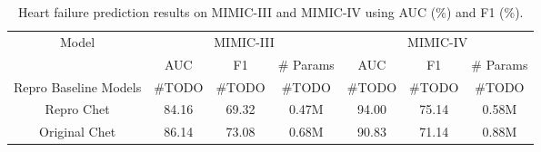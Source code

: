 \documentclass[11pt,a4paper,fleqn]{article}
\begin{document}
\begin{table*}[ht]
  \centering
  \begin{tabular}{|c|c|c|c|c|c|c|}
  \hline
  {Model} & \multicolumn{3}{c|}{MIMIC-III} & \multicolumn{3}{c|}{MIMIC-IV} \\
   \cline{2-7} & AUC & F1 & \# Params & AUC & F1 & \# Params \\ \hline
  {Repro Baseline Models} & \#TODO & \#TODO & \#TODO & \#TODO & \#TODO & \#TODO \\
  \cline{1-7} {Repro Chet} & 84.16 & 69.32 & 0.47M & 94.00 & 75.14 & 0.58M \\
  \cline{1-7} {Original Chet} & 86.14 & 73.08 & 0.68M & 90.83 & 71.14 & 0.88M \\
  \cline{1-7}
  \end{tabular}
  \caption{Heart failure prediction results on MIMIC-III and MIMIC-IV using AUC (\%) and F1 (\%).}
  \label{tab:hf}
  \end{table*}
\end{document}
